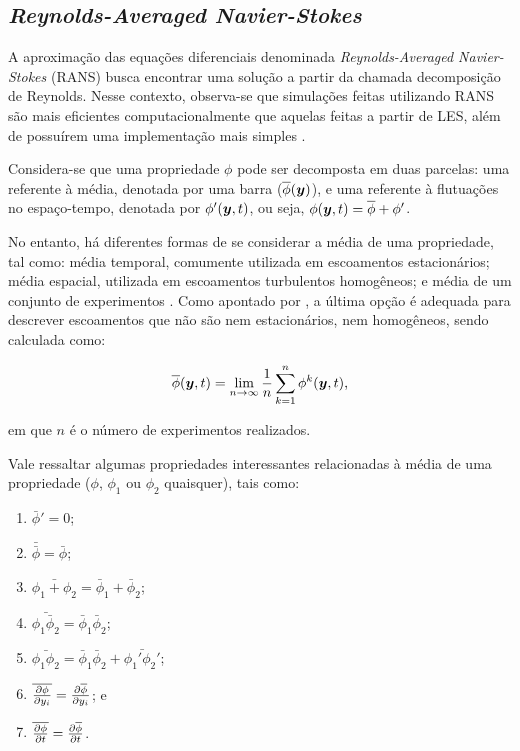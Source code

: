 \subsection{\textit{Reynolds-Averaged Navier-Stokes}} \label{RANS}

A aproximação das equações diferenciais denominada \textit{Reynolds-Averaged Navier-Stokes} (RANS) busca encontrar uma solução a partir da chamada decomposição de Reynolds. Nesse contexto, observa-se que simulações feitas utilizando RANS são mais eficientes computacionalmente que aquelas feitas a partir de LES, além de possuírem uma implementação mais simples \cite{alfonsi2009reynolds, ling2015evaluation}.

Considera-se que uma propriedade $\phi$ pode ser decomposta em duas parcelas: uma referente à média, denotada por uma barra ($\overline{\phi}(\boldsymbol{y})$), e uma referente à flutuações no espaço-tempo, denotada por $\phi'(\boldsymbol{y},t)$, ou seja, $\phi(\boldsymbol{y},t)=\overline{\phi}+\phi'$.

No entanto, há diferentes formas de se considerar a média de uma propriedade, tal como: média temporal, comumente utilizada em escoamentos estacionários; média espacial, utilizada em escoamentos turbulentos homogêneos; e média de um conjunto de experimentos \cite{tennekes1972first,speziale1991analytical,alfonsi2009reynolds}. Como apontado por , a última opção é adequada para descrever escoamentos que não são nem estacionários, nem homogêneos, sendo calculada como:

\begin{equation}
    \overline{\phi}(\boldsymbol{y},t)=\lim_{n\to\infty}{\frac{1}{n}\sum_{k=1}^n{\phi^{k}(\boldsymbol{y},t)}}\text{,}
\end{equation}

\noindent em que $n$ é o número de experimentos realizados.

Vale ressaltar algumas propriedades interessantes relacionadas à média de uma propriedade ($\phi$, $\phi_1$ ou $\phi_2$ quaisquer), tais como:

\begin{enumerate}[label=\alph*.]
    \item $\bar{\phi}'=0$;
    \item $\bar{\bar{\phi}}=\bar{\phi}$;
    \item $\bar{\phi_1+\phi_2}=\bar{\phi}_1+\bar{\phi}_2$;
    \item $\bar{\phi_1\bar{\phi}_2}=\bar{\phi}_1\bar{\phi}_2$;
    \item $\bar{\phi_1\phi_2}=\bar{\phi}_1\bar{\phi}_2+\bar{\phi_1'\phi_2'}$;
    \item $\overline{\frac{\partial{\phi}}{\partial{y_i}}}=\frac{\partial{\overline{\phi}}}{\partial{y_i}}$; e
    \item $\overline{\frac{\partial{\phi}}{\partial{t}}}=\frac{\partial{\overline{\phi}}}{\partial{t}}$.
\end{enumerate}


